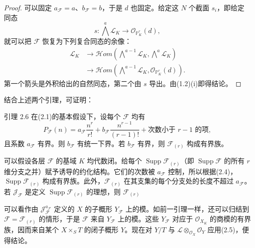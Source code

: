 \begin{proof}
可以固定 $a_{\mathcal F}=a$、$b_{\mathcal F}=b$，于是 $d$ 也固定。给定这 $N$ 个截面 $s_i$，即给定同态
\[
s:\bigwedge^a\mathcal L_K\longrightarrow\mathcal O_{\mathbb P^r_K}(d),
\]
就可以把 $\mathcal F$ 恢复为下列复合同态的余像：
\[
\begin{aligned}
\mathcal L_K&\longrightarrow
\mathcal{H}om\!\left(\bigwedge^{a-1}\mathcal L_K,
\bigwedge^a\mathcal L_K\right)\\
&\longrightarrow\mathcal{H}om\!\left(\bigwedge^{a-1}\mathcal L_K,
\mathcal O_{\mathbb P^r_K}(d)\right).
\end{aligned}
\]
第一个箭头是外积给出的自然同态，第二个由 $s$ 导出。由(1.2)(i)即得结论。
\end{proof}

结合上述两个引理，可证明：
\begin{statement}{引理 2.6}
在(2.1)的基本假设下，设每个 $\mathcal F$ 均有
\[
P_{\mathcal F}(n)=a_{\mathcal F}\frac{n^r}{r!}
+b_{\mathcal F}\frac{n^{r-1}}{(r-1)!}
+\text{次数小于 }r-1\text{ 的项},
\]
且系数 $a_{\mathcal F}$ 有界。则 $b_{\mathcal F}$ 有统一下界。若 $b_{\mathcal F}$ 有界，则 $\mathcal F_{(r)}$ 构成有界族。
\end{statement}
可以假设各层 $\mathcal F$ 的基域 $K$ 均代数闭。给每个 $\operatorname{Supp}\mathcal F_{(r)}$（即 $\operatorname{Supp}\mathcal F$ 的所有 $r$ 维分支之并）赋予诱导的约化结构。它们的次数被 $a_{\mathcal F}$ 控制，所以根据(2.4)，$\operatorname{Supp}\mathcal F_{(r)}$ 构成有界族。此外，$\mathcal F_{(r)}$ 在其支集的每个分支处的长度不超过 $a_{\mathcal F}$。若 $\mathcal J_{\mathcal F}$ 是定义 $\operatorname{Supp}\mathcal F_{(r)}$ 的理想，则 $\mathcal F_{(r)}$

可以看作由 $\mathcal J_{\mathcal F}^{a_{\mathcal F}}$ 定义的 $X$ 的子概形 $Y_{\mathcal F}$ 上的模。如前一引理一样，还可以归结到 $\mathcal F=\mathcal F_{(r)}$ 的情形，于是 $\mathcal F$ 来自 $Y_{\mathcal F}$ 上的模。这些 $Y_{\mathcal F}$ 对应于 $\mathcal O_{X_K}$ 的商模的有界族，因而来自某个 $X\times_ST$ 的闭子概形 $Y$。现在对 $Y/T$ 与 $\mathcal L\otimes_{\mathcal O_X}\mathcal O_Y$ 应用(2.5)，便得结论。

